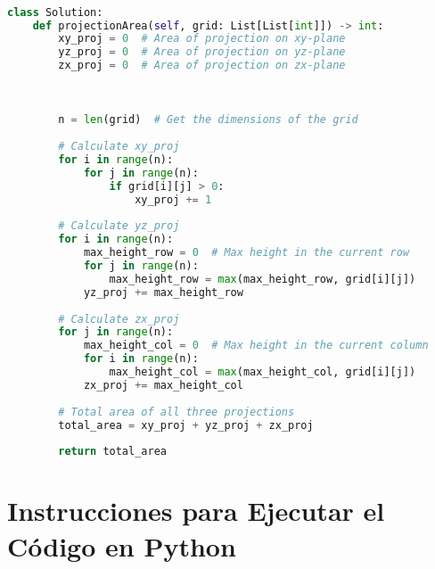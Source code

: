 \documentclass[12pt]{article}
\begin{document}
\begin{lstlisting}[language=Python]

class Solution:
    def projectionArea(self, grid: List[List[int]]) -> int: 
        xy_proj = 0  # Area of projection on xy-plane
        yz_proj = 0  # Area of projection on yz-plane
        zx_proj = 0  # Area of projection on zx-plane
        
        

        n = len(grid)  # Get the dimensions of the grid
        
        # Calculate xy_proj
        for i in range(n):
            for j in range(n):
                if grid[i][j] > 0:
                    xy_proj += 1
        
        # Calculate yz_proj
        for i in range(n):
            max_height_row = 0  # Max height in the current row
            for j in range(n):
                max_height_row = max(max_height_row, grid[i][j])
            yz_proj += max_height_row
        
        # Calculate zx_proj
        for j in range(n):
            max_height_col = 0  # Max height in the current column
            for i in range(n):
                max_height_col = max(max_height_col, grid[i][j])
            zx_proj += max_height_col
        
        # Total area of all three projections
        total_area = xy_proj + yz_proj + zx_proj
        
        return total_area


\end{lstlisting}

\section{Instrucciones para Ejecutar el Código en Python}
\end{document}
